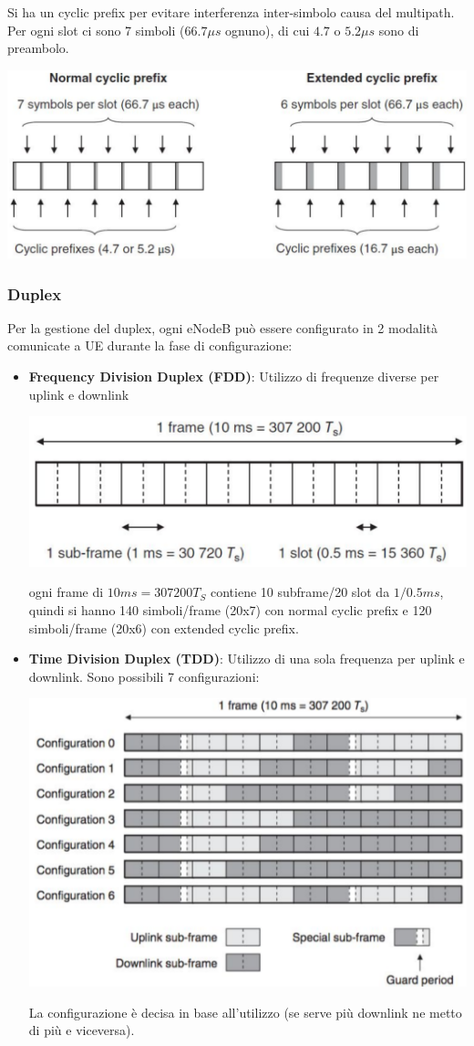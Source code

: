Si ha un cyclic prefix per evitare interferenza inter-simbolo causa del multipath. Per ogni slot ci sono 7 simboli ($66.7 \mu s$ ognuno), di cui $4.7$ o $5.2 \mu s$ sono di preambolo.
\begin{center}
	\includegraphics[width=0.7\linewidth]{img/4g/cycprefix}
\end{center}

\subsubsection{Duplex}

Per la gestione del duplex, ogni eNodeB può essere configurato in 2 modalità comunicate a UE durante la fase di configurazione: 
\begin{itemize}
	\item \textbf{Frequency Division Duplex (FDD)}: Utilizzo di frequenze diverse per uplink e downlink
	\begin{center}
		\includegraphics[width=0.5\linewidth]{img/4g/fdd}
	\end{center}
	ogni frame di $10ms = 307200 T_S$ contiene 10 subframe/20 slot da $1/0.5ms$, quindi si hanno 140 simboli/frame (20x7) con normal cyclic prefix e 120 simboli/frame (20x6) con extended cyclic prefix.\\
	
	\item \textbf{Time Division Duplex (TDD)}: Utilizzo di una sola frequenza per uplink e downlink. Sono possibili 7 configurazioni:
	\begin{center}
		\includegraphics[width=0.7\linewidth]{img/4g/tdd}
	\end{center}
	La configurazione è decisa in base all'utilizzo (se serve più downlink ne metto di più e viceversa).
\end{itemize}

